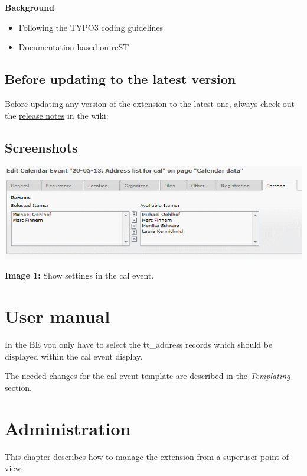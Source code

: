 \documentclass[a4paper,10pt,english]{sphinxtypo3manual}
\begin{document}
\textbf{Background}
\begin{itemize}
\item {} 
Following the TYPO3 coding guidelines

\item {} 
Documentation based on reST

\end{itemize}


\section{Before updating to the latest version}
\label{index:before-updating-to-the-latest-version}
Before updating any version of the extension to the latest one, always
check out the \href{http://forge.typo3.org/projects/extension-addresslist4cal/wiki/Release\_Notes}{release notes} in the wiki:


\section{Screenshots}
\label{index:release-notes}\label{index:screenshots}
\includegraphics{manual_html_cal_event.png}

\textbf{Image 1:} Show settings in the cal event.


\chapter{User manual}
\label{index:user-manual}
In the BE you only have to select the tt\_address records which should
be displayed within the cal event display.

The needed changes for the cal event template are described in the
{\hyperref[index:my-templating-label]{\emph{Templating}}} section.


\chapter{Administration}
\label{index:administration}
This chapter describes how to manage the extension from a superuser point of view.
\end{document}
